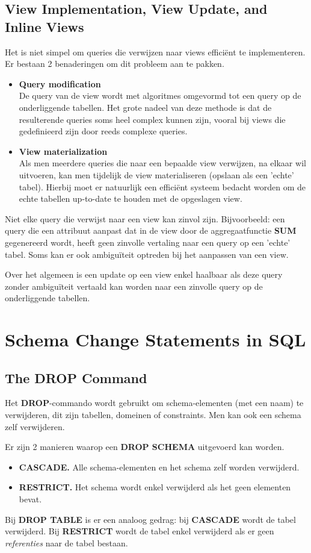 \subsection{View Implementation, View Update, and Inline Views}
Het is niet simpel om queries die verwijzen naar views effici\"ent te implementeren. Er bestaan 2 benaderingen om dit probleem aan te pakken.
\begin{itemize}
\item \textbf{Query modification}\\
De query van de view wordt met algoritmes omgevormd tot een query op de onderliggende tabellen. Het grote nadeel van deze methode is dat de resulterende queries soms heel complex kunnen zijn, vooral bij views die gedefinieerd zijn door reeds complexe queries.
\item \textbf{View materialization}\\
Als men meerdere queries die naar een bepaalde view verwijzen, na elkaar wil uitvoeren, kan men tijdelijk de view materialiseren (opslaan als een 'echte' tabel). Hierbij moet er natuurlijk een effici\"ent systeem bedacht worden om de echte tabellen up-to-date te houden met de opgeslagen view.
\end{itemize}
Niet elke query die verwijst naar een view kan zinvol zijn. Bijvoorbeeld: een query die een attribuut aanpast dat in de view door de aggregaatfunctie \textbf{SUM} gegenereerd wordt, heeft geen zinvolle vertaling naar een query op een 'echte' tabel. Soms kan er ook ambigu\"iteit optreden bij het aanpassen van een view.

Over het algemeen is een update op een view enkel haalbaar als deze query zonder ambigu\"iteit vertaald kan worden naar een zinvolle query op de onderliggende tabellen.



\section{Schema Change Statements in SQL}
\subsection{The DROP Command}
Het \textbf{DROP}-commando wordt gebruikt om schema-elementen (met een naam) te verwijderen, dit zijn tabellen, domeinen of constraints. Men kan ook een schema zelf verwijderen.

Er zijn 2 manieren waarop een \textbf{DROP SCHEMA} uitgevoerd kan worden.
\begin{itemize}
\item \textbf{CASCADE.} Alle schema-elementen en het schema zelf worden verwijderd.
\item \textbf{RESTRICT.} Het schema wordt enkel verwijderd als het geen elementen bevat.
\end{itemize}
Bij \textbf{DROP TABLE} is er een analoog gedrag: bij \textbf{CASCADE} wordt de tabel verwijderd. Bij \textbf{RESTRICT} wordt de tabel enkel verwijderd als er geen \textit{referenties} naar de tabel bestaan. 


